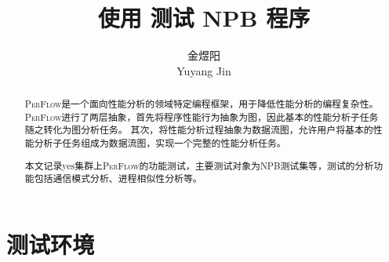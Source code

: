 \documentclass[lang=cn,11pt,a4paper]{elegantpaper}
\title{使用 \perflow{} 测试 NPB 程序}
\author{金煜阳 \\ Yuyang Jin}
\institute{清华大学计算机系 \\ PACMAN实验室}
\date{\zhtoday}
\newcommand{\perflow}{\textsc{PerFlow}\xspace}
\begin{document}
\maketitle

\begin{abstract}
  \perflow{}是一个面向性能分析的领域特定编程框架，用于降低性能分析的编程复杂性。
  \perflow{}进行了两层抽象，首先将程序性能行为抽象为图，因此基本的性能分析子任务随之转化为图分析任务。
  其次，将性能分析过程抽象为数据流图，允许用户将基本的性能分析子任务组成为数据流图，实现一个完整的性能分析任务。
  
  本文记录yes集群上\perflow{}的功能测试，主要测试对象为NPB测试集等，测试的分析功能包括通信模式分析、进程相似性分析等。
\end{abstract}

\section*{测试环境}






\appendix
\addappheadtotoc
\end{document}
